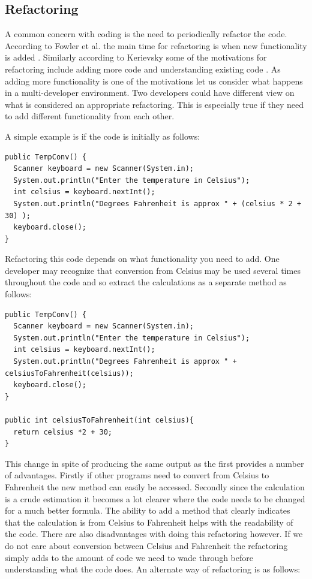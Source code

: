 \documentclass[12pt]{CRPITStyle}
\renewcommand{\cite}{\citep}
\begin{document}
\subsection{Refactoring}
A common concern with coding is the need to periodically refactor the code. According to Fowler et al. the main time for refactoring is when new functionality is added \cite{Fowler1999}. Similarly according to Kerievsky some of the motivations for refactoring include adding more code and understanding existing code \cite{Kerievsky2004}. As adding more functionality is one of the motivations let us consider what happens in a multi-developer environment. Two developers could have different view on what is considered an appropriate refactoring. This is especially true if they need to add different functionality from each other. 


A simple example is if the code is initially as follows:
\begin{verbatim}
public TempConv() {
  Scanner keyboard = new Scanner(System.in);
  System.out.println("Enter the temperature in Celsius");
  int celsius = keyboard.nextInt();
  System.out.println("Degrees Fahrenheit is approx " + (celsius * 2 + 30) );
  keyboard.close();
}
\end{verbatim}

Refactoring this code depends on what functionality you need to add. One developer may recognize that conversion from Celsius may be used several times throughout the code and so extract the calculations as a separate method as follows:

\begin{verbatim}
public TempConv() {
  Scanner keyboard = new Scanner(System.in);
  System.out.println("Enter the temperature in Celsius");
  int celsius = keyboard.nextInt();
  System.out.println("Degrees Fahrenheit is approx " + celsiusToFahrenheit(celsius));
  keyboard.close();
}

public int celsiusToFahrenheit(int celsius){
  return celsius *2 + 30;
}
\end{verbatim}

This change in spite of producing the same output as the first provides a number of advantages. Firstly if other programs need to convert from Celsius to Fahrenheit the new method can easily be accessed. Secondly since the calculation is a crude estimation it becomes a lot clearer where the code needs to be changed for a much better formula. The ability to add a method that clearly indicates that the calculation is from Celsius to Fahrenheit helps with the readability of the code. There are also disadvantages with doing this refactoring however. If we do not care about conversion between Celsius and Fahrenheit the refactoring simply adds to the amount of code we need to wade through before understanding what the code does. An alternate way of refactoring is as follows:
\end{document}
